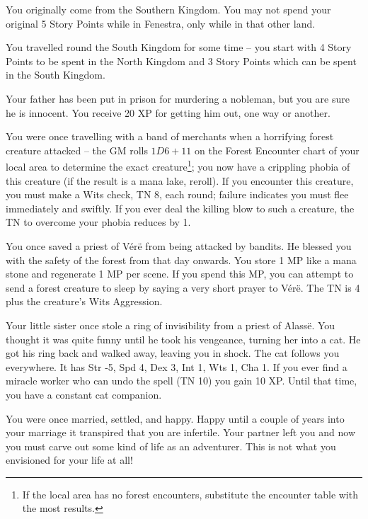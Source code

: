 \begin{multicols}{2}
\begin{list}{\addtocounter{list}{1}\textbf{:}}{\raggedleft}
\item{You originally come from the Southern Kingdom.  You may not spend your original 5 Story Points while in Fenestra, only while in that other land.}

\item{You travelled round the South Kingdom for some time -- you start with 4 Story Points to be spent in the North Kingdom and 3 Story Points which can be spent in the South Kingdom.}

\item{Your father has been put in prison for murdering a nobleman, but you are sure he is innocent.  You receive 20 XP for getting him out, one way or another.}

\item{You were once travelling with a band of merchants when a horrifying forest creature attacked -- the GM rolls $1D6+11$ on the Forest Encounter chart of your local area to determine the exact creature\footnote{If the local area has no forest encounters, substitute the encounter table with the most results.}; you now have a crippling phobia of this creature (if the result is a mana lake, reroll).  If you encounter this creature, you must make a Wits check, TN 8, each round; failure indicates you must flee immediately and swiftly.  If you ever deal the killing blow to such a creature, the TN to overcome your phobia reduces by 1.}

\item{You once saved a priest of V\'{e}r\"{e} from being attacked by bandits.  He blessed you with the safety of the forest from that day onwards.  You store 1 MP like a mana stone and regenerate 1 MP per scene.  If you spend this MP, you can attempt to send a forest creature to sleep by saying a very short prayer to V\'{e}r\"{e}.  The TN is 4 plus the creature's Wits  Aggression.}

\item{Your little sister once stole a ring of invisibility from a priest of Alass\"{e}.  You thought it was quite funny until he took his vengeance, turning her into a cat.  He got his ring back and walked away, leaving you in shock.  The cat follows you everywhere.  It has Str -5, Spd 4, Dex 3, Int 1, Wts 1, Cha 1.  If you ever find a miracle worker who can undo the spell (TN 10) you gain 10 XP.  Until that time, you have a constant cat companion.}

\item{You were once married, settled, and happy.  Happy until a couple of years into your marriage it transpired that you are infertile.  Your partner left you and now you must carve out some kind of life as an adventurer.  This is not what you envisioned for your life at all!}


\end{list}
\end{multicols}

